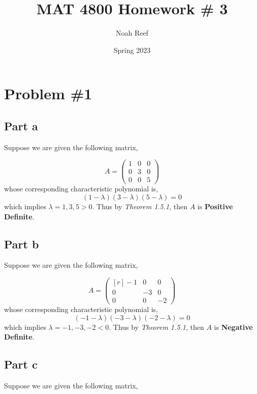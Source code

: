 \documentclass{article}
\title{MAT 4800 Homework \# 3}
\author{Noah Reef }
\date{Spring 2023}
\begin{document}
\maketitle
\section*{Problem \#1}
\subsection*{Part a}
Suppose we are given the following matrix,

\begin{equation*}
   A = \begin{pmatrix}
    1 & 0 & 0 \\
    0 & 3 & 0 \\
    0 & 0 & 5
    \end{pmatrix}
\end{equation*}
whose corresponding characteristic polynomial is,
\begin{equation*}
    (1-\lambda)(3-\lambda)(5-\lambda) = 0
\end{equation*}
which implies $\lambda = 1,3,5 > 0$. Thus by \textit{Theorem 1.5.1}, then $A$ is \textbf{Positive Definite}.

\subsection*{Part b}
Suppose we are given the following matrix,

\begin{equation*}
   A = \begin{pmatrix*}[r]
    -1 & 0 & 0 \\
    0 & -3 & 0 \\
    0 & 0 & -2
    \end{pmatrix*}
\end{equation*}
whose corresponding characteristic polynomial is,
\begin{equation*}
    (-1-\lambda)(-3-\lambda)(-2-\lambda) = 0
\end{equation*}
which implies $\lambda = -1,-3,-2 < 0$. Thus by \textit{Theorem 1.5.1}, then $A$ is \textbf{Negative Definite}.

\subsection*{Part c}
Suppose we are given the following matrix,
\end{document}
